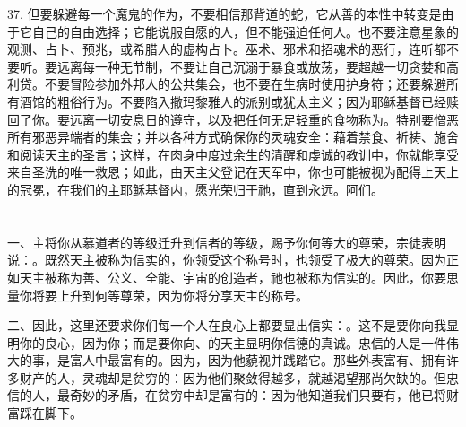 37. 但要躲避每一个魔鬼的作为，不要相信那背道的蛇，它从善的本性中转变是由于它自己的自由选择；它能说服自愿的人，但不能强迫任何人。也不要注意星象的观测、占卜、预兆，或希腊人的虚构占卜。巫术、邪术和招魂术的恶行，连听都不要听。要远离每一种无节制，不要让自己沉溺于暴食或放荡，要超越一切贪婪和高利贷。不要冒险参加外邦人的公共集会，也不要在生病时使用护身符；还要躲避所有酒馆的粗俗行为。不要陷入撒玛黎雅人的派别或犹太主义；因为耶稣基督已经赎回了你。要远离一切安息日的遵守，以及把任何无足轻重的食物称为。特别要憎恶所有邪恶异端者的集会；并以各种方式确保你的灵魂安全：藉着禁食、祈祷、施舍和阅读天主的圣言；这样，在肉身中度过余生的清醒和虔诚的教训中，你就能享受来自圣洗的唯一救恩；如此，由天主父登记在天军中，你也可能被视为配得上天上的冠冕，在我们的主耶稣基督内，愿光荣归于祂，直到永远。阿们。\par



\section{}

\par

\par

\par

一、主将你从慕道者的等级迁升到信者的等级，赐予你何等大的尊荣，宗徒表明说：。既然天主被称为信实的，你领受这个称号时，也领受了极大的尊荣。因为正如天主被称为善、公义、全能、宇宙的创造者，祂也被称为信实的。因此，你要思量你将要上升到何等尊荣，因为你将分享天主的称号。\par

二、因此，这里还要求你们每一个人在良心上都要显出信实：。这不是要你向我显明你的良心，因为你；而是要你向、的天主显明你信德的真诚。忠信的人是一件伟大的事，是富人中最富有的。因为，因为他藐视并践踏它。那些外表富有、拥有许多财产的人，灵魂却是贫穷的：因为他们聚敛得越多，就越渴望那尚欠缺的。但忠信的人，最奇妙的矛盾，在贫穷中却是富有的：因为他知道我们只要有，他已将财富踩在脚下。\par

